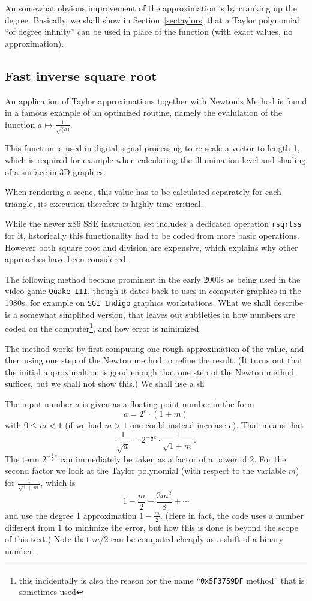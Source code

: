 An somewhat obvious improvement of the approximation is by cranking up the
degree. Basically, we shall show in Section~\ref{sectaylors}
that a Taylor polynomial ``of degree
infinity'' can be used in place of the function (with exact values, no
approximation).

\subsection{Fast inverse square root}

An application of Taylor approximations together with Newton's Method 
is found in a famous example of an
optimized routine, namely the evalulation of the function $a\mapsto
\frac{1}{\sqrt(a)}$.

This function is used in digital signal processing to re-scale a vector to
length 1, which is required for example when calculating the illumination
level and shading of a surface in 3D graphics. 

When rendering a scene, this value has to be calculated separately for each
triangle, its execution therefore is highly time critical.

While the newer x86 SSE instruction set includes a dedicated operation
\texttt{rsqrtss} for it, hstorically this functionality had to be coded from
more basic operations. However both square root and division are expensive,
which explains why other approaches have been considered.

The following method became prominent in the early 2000s as being used in
the video game \texttt{Quake III}, though it dates back to uses in computer
graphics in the 1980s, for example on \texttt{SGI Indigo} graphics
workstations. What we shall describe is a somewhat simplified version, that
leaves out subtleties in how numbers are coded on the computer\footnote{this
incidentally is also the
reason for the name ``\texttt{0x5F3759DF} method'' that is sometimes used},
and how error is minimized.
\medskip

The method works by first computing one rough approximation of the value,
and then using one step of the Newton method to refine the result. (It turns
out that the initial approximaltion is good enough that one step of the
Newton method suffices, but we shall not show this.) We shall use a sli
\smallskip

The input number $a$ is given as a floating point number in the form
\[
a=2^e\cdot(1+m)
\]
with $0\le m<1$ (if we had $m>1$ one could instead increase $e$).
That means that
\[
\frac{1}{\sqrt{a}}=2^{-\frac12e}\cdot\frac{1}{\sqrt{1+m}}.
\]
The term $2^{-\frac12e}$ can immediately be taken as a factor of a power of
$2$. For the second factor we look at the Taylor polynomial (with respect to
the variable $m$) for $\frac{1}{\sqrt{1+m}}$, which is 
\[
1-\frac{m}{2}+\frac{3m^2}{8}+\cdots
\]
and use the degree 1 approximation $1-\frac{m}{2}$. (Here in fact, the
code uses a number different from $1$ to minimize the error, but
how this is done is beyond the scope of this text.) Note that $m/2$ can be
computed cheaply as a shift of a binary number.

